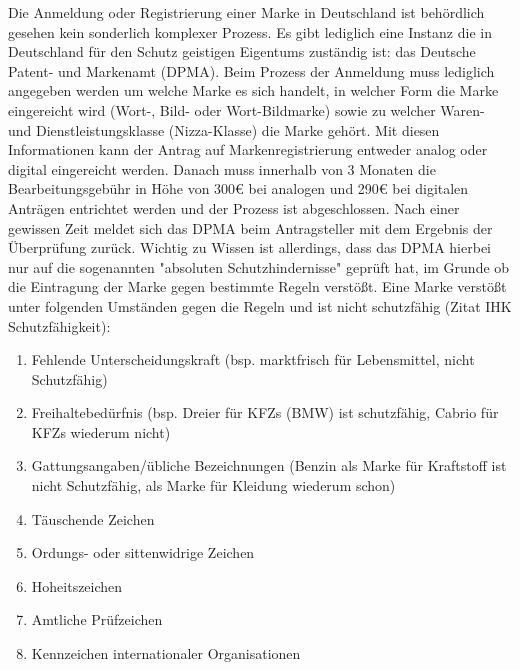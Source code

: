 Die Anmeldung oder Registrierung einer Marke in Deutschland ist behördlich gesehen kein sonderlich komplexer Prozess. Es gibt lediglich eine Instanz die in Deutschland für den Schutz geistigen Eigentums zuständig ist: das Deutsche Patent- und Markenamt (DPMA). Beim Prozess der Anmeldung muss lediglich angegeben werden um welche Marke es sich handelt, in welcher Form die Marke eingereicht wird (Wort-, Bild- oder Wort-Bildmarke) sowie zu welcher Waren- und Dienstleistungsklasse (Nizza-Klasse) die Marke gehört. Mit diesen Informationen kann der Antrag auf Markenregistrierung entweder analog oder digital eingereicht werden. Danach muss innerhalb von 3 Monaten die Bearbeitungsgebühr in Höhe von 300€ bei analogen und 290€ bei digitalen Anträgen entrichtet werden und der Prozess ist abgeschlossen. Nach einer gewissen Zeit meldet sich das DPMA beim Antragsteller mit dem Ergebnis der Überprüfung zurück. Wichtig zu Wissen ist allerdings, dass das DPMA hierbei nur auf die sogenannten "absoluten Schutzhindernisse" geprüft hat, im Grunde ob die Eintragung der Marke gegen bestimmte Regeln verstößt. Eine Marke verstößt unter folgenden Umständen gegen die Regeln und ist nicht schutzfähig (Zitat IHK Schutzfähigkeit):

\begin{enumerate}
    \item Fehlende Unterscheidungskraft (bsp. marktfrisch für Lebensmittel, nicht Schutzfähig)
    \item Freihaltebedürfnis (bsp. Dreier für KFZs (BMW) ist schutzfähig, Cabrio für KFZs wiederum nicht)
    \item Gattungsangaben/übliche Bezeichnungen (Benzin als Marke für Kraftstoff ist nicht Schutzfähig, als Marke für Kleidung wiederum schon)
    \item Täuschende Zeichen
    \item Ordungs- oder sittenwidrige Zeichen
    \item Hoheitszeichen
    \item Amtliche Prüfzeichen
    \item Kennzeichen internationaler Organisationen
\end{enumerate}

